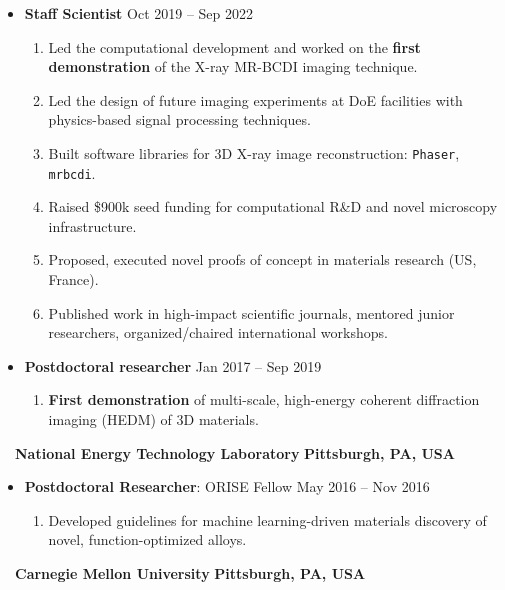 \documentclass[10.5pt]{article}
\begin{document}
\begin{itemize}
    \item
        \textbf{Staff Scientist}
        \hfill  {Oct 2019 -- Sep 2022} \par
        \begin{enumerate}
            \item Led the computational development and worked on the \textbf{first demonstration} of the X-ray MR-BCDI imaging technique.
            \item Led the design of future imaging experiments at DoE facilities with physics-based signal processing techniques.
            \item Built software libraries for 3D X-ray image reconstruction: \texttt{Phaser}, \texttt{mrbcdi}. 
            \item Raised \$900k seed funding for computational R\&D and novel microscopy infrastructure. 
            \item Proposed, executed novel proofs of concept in materials research (US, France).
            \item Published work in high-impact scientific journals, mentored junior researchers, organized/chaired international workshops.
        \end{enumerate}
    \item
        \textbf{Postdoctoral researcher}
        \hfill  {Jan 2017 -- Sep 2019} \par
        \begin{enumerate}
            \item \textbf{First demonstration} of multi-scale, high-energy coherent diffraction imaging (HEDM) of 3D materials.
        \end{enumerate}
\end{itemize} ~~{\color{black}\textbf{National Energy Technology Laboratory} \hfill  \textbf{Pittsburgh, PA, USA}}\par
\begin{itemize}
    \item
        \textbf{Postdoctoral Researcher}: ORISE Fellow
        \hfill  {May 2016 -- Nov 2016} \par
        \begin{enumerate}
            \item Developed guidelines for machine learning-driven materials discovery of novel, function-optimized alloys.
        \end{enumerate}
\end{itemize} ~~{\color{black}\textbf{Carnegie Mellon University} \hfill  \textbf{Pittsburgh, PA, USA}}\par
\end{document}
